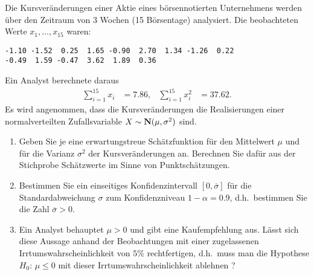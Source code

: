  Die Kursveränderungen einer Aktie eines
börsennotierten Unternehmens werden über den Zeitraum von 3 Wochen (15
Börsentage) analysiert. Die beobachteten Werte $x_{1},\dots ,x_{15}$ waren:
\begin{lstlisting}
-1.10 -1.52  0.25  1.65 -0.90  2.70  1.34 -1.26  0.22
-0.49  1.59 -0.47  3.62  1.89  0.36
\end{lstlisting}    
Ein Analyst berechnete daraus
\begin{align*}
    \sum_{i=1}^{15} x_i &= 7.86, & \sum_{i=1}^{15} x^{2}_i &= 37.62.
\end{align*}
Es wird angenommen, dass die Kursveränderungen die Realisierungen einer normalverteilten
Zufallsvariable $X\sim \mathbf N(\mu, \sigma^2)$ sind.
\begin{enumerate}
    \item Geben Sie je eine erwartungstreue Schätzfunktion für den Mittelwert $\mu$ und für
    die Varianz $\sigma^2$ der Kursveränderungen an. Berechnen Sie daf\"ur aus der Stichprobe Schätzwerte im
    Sinne von Punktsch\"atzungen.
    \item Bestimmen Sie ein einseitiges Konfidenzintervall $[0,\overline \sigma]$ f\"ur die Standardabweichung $\sigma$
    zum Konfidenzniveau $1-\alpha=0.9$, d.h.~bestimmen Sie die Zahl $\overline \sigma>0$.
    \item Ein Analyst behauptet $\mu>0$ und gibt eine Kaufempfehlung aus. Lässt
    sich diese Aussage anhand der Beobachtungen mit einer zugelassenen
    Irrtumswahrscheinlichkeit von $5\%$ rechtfertigen, d.h.~muss man die Hypothese $H_0: \, \mu \le 0$ 
    mit dieser Irrtums\-wahrscheinlichkeit   ablehnen ?
\end{enumerate}

